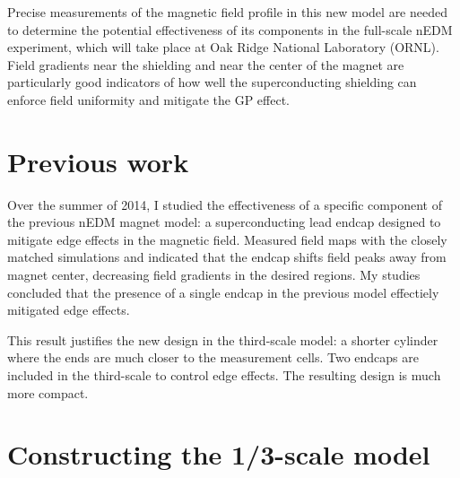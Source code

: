 \documentclass[twocolumn,aps,prb,citeautoscript]{revtex4-1}
\begin{document}
Precise measurements of the magnetic field profile in this new model are needed to determine the potential
effectiveness of its components in the full-scale nEDM experiment, which will take place at Oak Ridge
National Laboratory (ORNL). Field gradients near the shielding and near
the center of the magnet are particularly good indicators of how well the
superconducting shielding can enforce field uniformity and mitigate the GP effect.

\section{Previous work}


Over the summer of 2014, I studied
the effectiveness of a specific component of the previous nEDM magnet model:
a superconducting lead endcap designed to
mitigate edge effects in the magnetic field. Measured field maps with the
closely matched simulations and indicated that the endcap shifts field peaks
away from magnet center, decreasing field gradients in the desired regions.
My studies concluded that the presence of a single endcap in the previous model
effectiely mitigated edge effects.

This result justifies the new design in the third-scale model: a shorter cylinder where the ends are much
closer to the measurement cells. Two endcaps are included in the third-scale to control edge effects. The
resulting design is much more compact.

%

\section{Constructing the 1/3-scale model}
\end{document}
